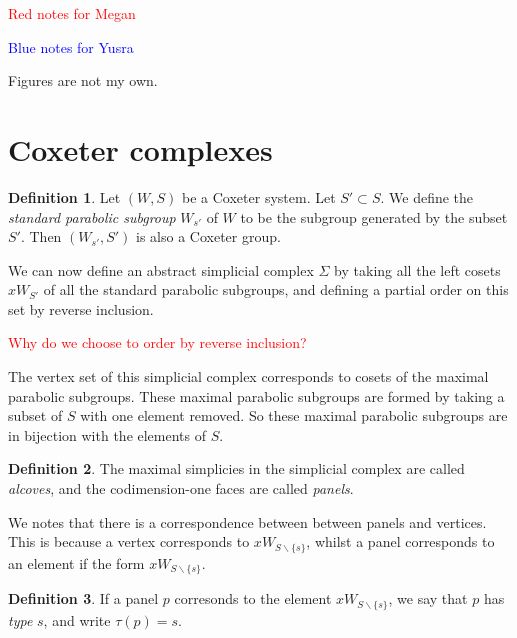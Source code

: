 \documentclass[11pt]{article}
\begin{document}
\newtheorem{theorem}{Theorem}
\theoremstyle{definition}
\newtheorem{definition}{Definition}
\newtheorem{proposition}{Proposition}
\newtheorem{example}{Example}
\newtheorem{lemma}{Lemma}
\newtheorem{corollary}{Corollary}
\newcommand{\uw}{\mathcal{U}(W,X)}
\newcommand{\W}{$(W,S)$}
\newcommand{\ix}{\textit}
\newcommand{\tr}{\textcolor{red}}
\newcommand{\sg}{$\Sigma$}
\tableofcontents 



\textcolor{red}{Red notes for Megan}

\textcolor{blue}{Blue notes for Yusra}

Figures are not my own.

\section{Coxeter complexes}
\begin{definition}
    Let $(W,S)$ be a Coxeter system. Let $S'\subset S$. We define the \textit{standard parabolic subgroup} $W_{s'}$ of $W$ to be the subgroup generated by the subset $S'$. Then $(W_{s'},S')$ is also a Coxeter group. 
\end{definition}

We can now define an abstract simplicial complex $\Sigma$ by taking all the left cosets $xW_{S'}$ of all the standard parabolic subgroups, and defining a partial order on this set by reverse inclusion. 

\textcolor{red}{Why do we choose to order by reverse inclusion?}

The vertex set of this simplicial complex corresponds to cosets of the maximal parabolic subgroups. These maximal parabolic subgroups are formed by taking a subset of $S$ with one element removed. So these maximal parabolic subgroups are in bijection with the elements of $S$. 


\begin{definition}
    The maximal simplicies in the simplicial complex are called \textit{alcoves}, and the codimension-one faces are called \textit{panels}.  
\end{definition}

We notes that there is a correspondence between between panels and vertices. This is because a vertex corresponds to $xW_{S\backslash \{s\}}$, whilst a panel corresponds to an element if the form $xW_{S\backslash \{s\}}$. 

\begin{definition}
    If a panel $p$ corresonds to the element $xW_{S\backslash \{s\}}$, we say that $p$ has \ix{type} $s$, and write $\tau(p)=s$. 
\end{definition}
\end{document}
